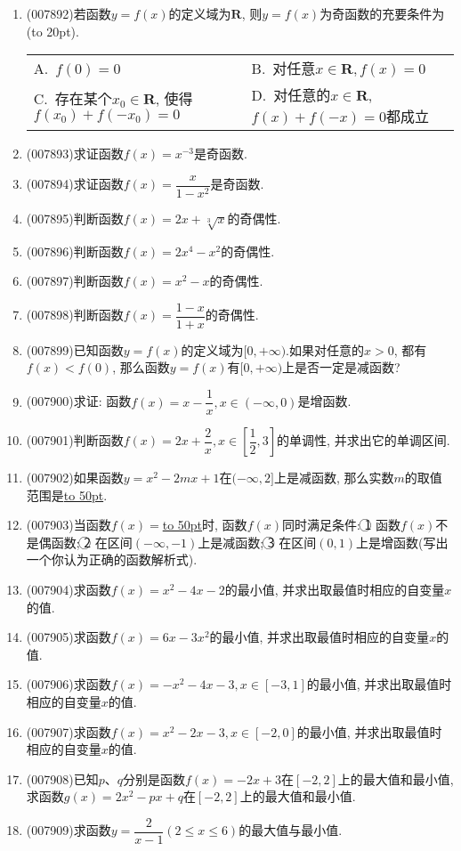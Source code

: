 \documentclass[10pt,a4paper]{article}
\newcommand{\blank}[1]{\underline{\hbox to #1pt{}}}
\newcommand{\bracket}[1]{(\hbox to #1pt{})}
\newcommand{\twoch}[4]{\par\begin{tabular}{p{.46\textwidth}p{.46\textwidth}}
A.~#1& B.~#2\\
C.~#3& D.~#4
\end{tabular}}
\begin{document}
\begin{enumerate}[1.]
\begin{center}
\end{center}
\item {\tiny (007892)}若函数$y=f(x)$的定义域为$\mathbf{R}$, 则$y=f(x)$为奇函数的充要条件为\bracket{20}.
\twoch{$f(0)=0$}{对任意$x\in \mathbf{R},f(x)=0$}{存在某个$x_0\in \mathbf{R}$, 使得$f(x_0)+f(-x_0)=0$}{对任意的$x\in \mathbf{R}$, $f(x)+f(-x)=0$都成立}
\item {\tiny (007893)}求证函数$f(x)=x^{-3}$是奇函数.
\item {\tiny (007894)}求证函数$f(x)=\dfrac x{1-x^2}$是奇函数.
\item {\tiny (007895)}判断函数$f(x)=2x+\sqrt[3]x$的奇偶性.
\item {\tiny (007896)}判断函数$f(x)=2x^4-x^2$的奇偶性.
\item {\tiny (007897)}判断函数$f(x)=x^2-x$的奇偶性.
\item {\tiny (007898)}判断函数$f(x)=\dfrac{1-x}{1+x}$的奇偶性.
\item {\tiny (007899)}已知函数$y=f(x)$的定义域为$[0,+\infty)$.如果对任意的$x>0$, 都有$f(x)<f(0)$, 那么函数$y=f(x)$有$[0,+\infty)$上是否一定是减函数?
\item {\tiny (007900)}求证: 函数$f(x)=x-\dfrac 1x,x\in (-\infty ,0)$是增函数.
\item {\tiny (007901)}判断函数$f(x)=2x+\dfrac 2x,x\in [\dfrac 12,3]$的单调性, 并求出它的单调区间.
\item {\tiny (007902)}如果函数$y=x^2-2mx+1$在$(-\infty ,2]$上是减函数, 那么实数$m$的取值范围是\blank{50}.
\item {\tiny (007903)}当函数$f(x)=$\blank{50}时, 函数$f(x)$同时满足条件: \textcircled{1} 函数$f(x)$不是偶函数; \textcircled{2} 在区间$(-\infty ,-1)$上是减函数; \textcircled{3} 在区间$(0,1)$上是增函数(写出一个你认为正确的函数解析式).
\item {\tiny (007904)}求函数$f(x)=x^2-4x-2$的最小值, 并求出取最值时相应的自变量$x$的值.
\item {\tiny (007905)}求函数$f(x)=6x-3x^2$的最小值, 并求出取最值时相应的自变量$x$的值.
\item {\tiny (007906)}求函数$f(x)=-x^2-4x-3,x\in [-3,1]$的最小值, 并求出取最值时相应的自变量$x$的值.
\item {\tiny (007907)}求函数$f(x)=x^2-2x-3,x\in [-2,0]$的最小值, 并求出取最值时相应的自变量$x$的值.
\item {\tiny (007908)}已知$p$、$q$分别是函数$f(x)=-2x+3$在$[-2,2]$上的最大值和最小值, 求函数$g(x)=2x^2-px+q$在$[-2,2]$上的最大值和最小值.
\item {\tiny (007909)}求函数$y=\dfrac 2{x-1}(2\le x\le 6)$的最大值与最小值.

\end{enumerate}
\end{document}
